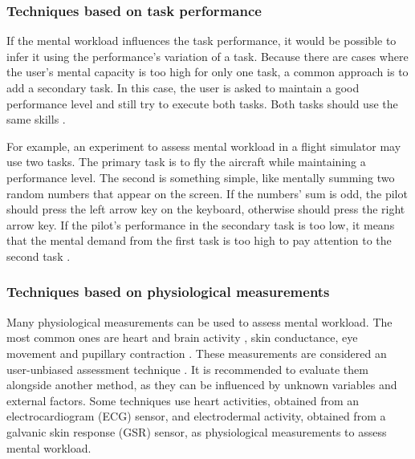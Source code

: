     \subsubsection*{Techniques based on task performance}
    
        If the mental workload influences the task performance, it would be possible to infer it using the performance's variation of a task. Because there are cases where the user's mental capacity is too high for only one task, a common approach is to add a secondary task. In this case, the user is asked to maintain a good performance level and still try to execute both tasks. Both tasks should use the same skills \cite{stanton2004handbook, sanders1998human}.
        
        For example, an experiment to assess mental workload in a flight simulator may use two tasks. The primary task is to fly the aircraft while maintaining a performance level. The second is something simple, like mentally summing two random numbers that appear on the screen. If the numbers' sum is odd, the pilot should press the left arrow key on the keyboard, otherwise should press the right arrow key. If the pilot's performance in the secondary task is too low, it means that the mental demand from the first task is too high to pay attention to the second task \cite{mohanavelu2020cognitive}.
        
    \subsubsection*{Techniques based on physiological measurements}
    
        Many physiological measurements can be used to assess mental workload. The most common ones are heart and brain activity \cite{chakladar2020eeg, orlandi2018measuring}, skin conductance, eye movement and pupillary contraction \cite{stanton2004handbook, rodriguez2015pupillometry}. These measurements are considered an user-unbiased assessment technique \cite{fallahi2016effects}. It is recommended to evaluate them alongside another method, as they can be influenced by unknown variables and external factors. Some techniques use heart activities, obtained from an electrocardiogram (ECG) sensor, and electrodermal activity, obtained from a galvanic skin response (GSR) sensor, as physiological measurements to assess mental workload.
                
